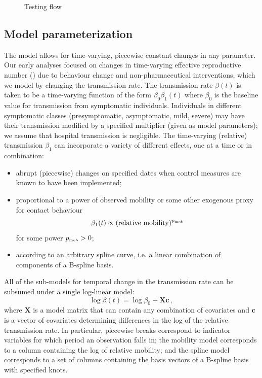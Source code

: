 \documentclass[12pt]{article}\usepackage[]{graphicx}\usepackage[]{color}
\begin{document}

\begin{figure}
  \caption{Testing flow}
  \label{fig:testing_flow}
\end{figure}

\subsection*{Model parameterization}

The model allows for time-varying, piecewise constant changes in any
parameter. Our early analyses focused on changes in time-varying effective reproductive
number (\Rt) due
to behaviour change and non-pharmaceutical interventions, which we model
by changing the transmission rate.
The transmission rate $\beta(t)$
is taken to be a time-varying function of the form
$\beta_0 \beta_1(t)$ 
where $\beta_0$ is the baseline value for transmission
from symptomatic individuals.
Individuals in different symptomatic classes (presymptomatic, asymptomatic, mild, severe)
may have their transmission modified by a specified multiplier (given as model parameters);
we assume that hospital transmission is negligible.
The time-varying (relative) transmission $\beta_1$ can incorporate a variety of different effects, one at a time or in combination:
\begin{itemize}
\item abrupt (piecewise) changes on specified dates when control
  measures are known to have been implemented;
\item proportional to a power of observed mobility or some other
  exogenous proxy for contact behaviour
\[
  \beta_1(t) \propto (\textrm{relative mobility})^{{{p}_{\textrm{\tiny mob}}}}
\]
for some power ${{p}_{\textrm{\tiny mob}}}>0$;
\item according to an arbitrary spline curve, i.e. a linear combination
  of components of a B-spline basis.
\end{itemize}

All of the sub-models for temporal change in the transmission
rate can be subsumed under a single log-linear model:
\begin{equation}\label{eq:betamodel}
\log \beta(t) = \log \beta_0 + \boldsymbol{X}\boldsymbol{c}
\,,
\end{equation}
where $\boldsymbol{X}$ is a model matrix that can contain any combination
of covariates and $\boldsymbol{c}$ is a vector of covariates determining
differences in the log of the relative transmission rate.
In particular, piecewise breaks correspond to indicator variables
for which period an observation falls in; the mobility model corresponds to a column
containing the log of relative mobility; and the spline model corresponds to a set of
columns containing the basis vectors of a B-spline basis with specified knots.
\end{document}
